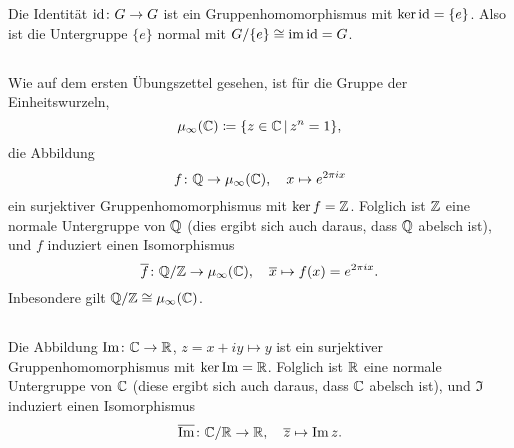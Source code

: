 \section{}





\subsection{}

Die Identität $\operatorname{id} \colon G \to G$ ist ein Gruppenhomomorphismus mit $\ker \operatorname{id} = \{e\}$.
Also ist die Untergruppe $\{e\}$ normal mit $G/\{e\} \cong \operatorname{im} \operatorname{id} = G$.





\subsection{}

Wie auf dem ersten Übungszettel gesehen, ist für die Gruppe der Einheitswurzeln,
\[
            \mu_\infty(\Complex)
  \coloneqq \{ z \in \Complex \suchthat z^n = 1 \},
\]
die Abbildung
\[
          f
  \colon  \mathbb{Q}
  \to     \mu_\infty(\mathbb{C}),
  \quad   x
  \mapsto e^{2 \pi i x}
\]
ein surjektiver Gruppenhomomorphismus mit $\ker f = \mathbb{Z}$.
Folglich ist $\mathbb{Z}$ eine normale Untergruppe von $\mathbb{Q}$ (dies ergibt sich auch daraus, dass $\mathbb{Q}$ abelsch ist), und $f$ induziert einen Isomorphismus
\[
          \overline{f}
  \colon  \mathbb{Q}/\mathbb{Z}
  \to     \mu_\infty(\mathbb{C}),
  \quad   \overline{x}
  \mapsto f(x)
  =       e^{2 \pi i x}.
\]
Inbesondere gilt $\mathbb{Q}/\mathbb{Z} \cong \mu_\infty(\mathbb{C})$.





\subsection{}

Die Abbildung $\operatorname{Im} \colon \mathbb{C} \to \mathbb{R}$, $z = x + iy \mapsto y$ ist ein surjektiver Gruppenhomomorphismus mit $\ker \operatorname{Im} = \mathbb{R}$.
Folglich ist $\mathbb{R}$ eine normale Untergruppe von $\mathbb{C}$ (diese ergibt sich auch daraus, dass $\mathbb{C}$ abelsch ist), und $\Im$ induziert einen Isomorphismus
\[
          \overline{\operatorname{Im}}
  \colon  \mathbb{C}/\mathbb{R}
  \to     \mathbb{R},
  \quad   \overline{z}
  \mapsto \operatorname{Im} z.
\]





